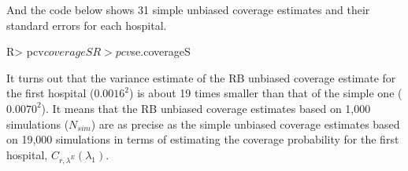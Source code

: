 \documentclass[article]{jss}
\begin{document}
And the code below shows 31 simple unbiased coverage estimates and their standard errors for each hospital.
\begin{CodeChunk}
\begin{CodeInput}
R> pcv$coverageS
R> pcv$se.coverageS
\end{CodeInput}
\end{CodeChunk}



It turns out that the variance estimate of the RB unbiased coverage estimate for the first hospital ($0.0016^2$) is about 19 times smaller than that of the simple one ($0.0070^2$). It means that the RB unbiased coverage estimates based on 1,000 simulations ($N_{sim}$) are as precise as the simple unbiased coverage estimates based on 19,000 simulations in terms of estimating the coverage probability for the first hospital, $C_{r, \lambda^E}(\lambda_1)$.
\end{document}
